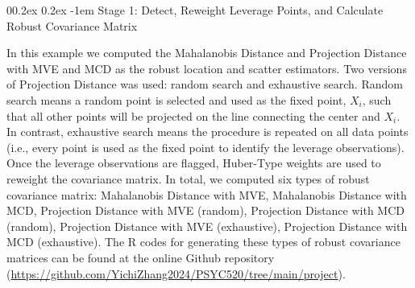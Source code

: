 \documentclass[
  man]{apa7}
\makeatletter
\let\oldparagraph\paragraph
\renewcommand{\paragraph}{
    \@ifstar
      \xxxParagraphStar
      \xxxParagraphNoStar
  }
\newcommand{\xxxParagraphStar}[1]{\oldparagraph*{#1}\mbox{}}
\newcommand{\xxxParagraphNoStar}[1]{\oldparagraph{#1}\mbox{}}
\renewcommand{\paragraph}{\@startsection{paragraph}{4}{\parindent}%
  {0\baselineskip \@plus 0.2ex \@minus 0.2ex}%
  {-1em}%
  {\normalfont\normalsize\bfseries\itshape\typesectitle}}
\makeatother
\begin{document}
\paragraph{Stage 1: Detect, Reweight Leverage Points, and Calculate Robust Covariance Matrix}\label{stage-1-detect-reweight-leverage-points-and-calculate-robust-covariance-matrix-1}

In this example we computed the Mahalanobis Distance and Projection Distance with MVE and MCD as the robust location and scatter estimators. Two versions of Projection Distance was used: random search and exhaustive search. Random search means a random point is selected and used as the fixed point, \(X_{i}\), such that all other points will be projected on the line connecting the center and \(X_{i}\). In contrast, exhaustive search means the procedure is repeated on all data points (i.e., every point is used as the fixed point to identify the leverage observations). Once the leverage observations are flagged, Huber-Type weights are used to reweight the covariance matrix. In total, we computed six types of robust covariance matrix: Mahalanobis Distance with MVE, Mahalanobis Distance with MCD, Projection Distance with MVE (random), Projection Distance with MCD (random), Projection Distance with MVE (exhaustive), Projection Distance with MCD (exhaustive). The R codes for generating these types of robust covariance matrices can be found at the online Github repository (\url{https://github.com/YichiZhang2024/PSYC520/tree/main/project}).
\end{document}
